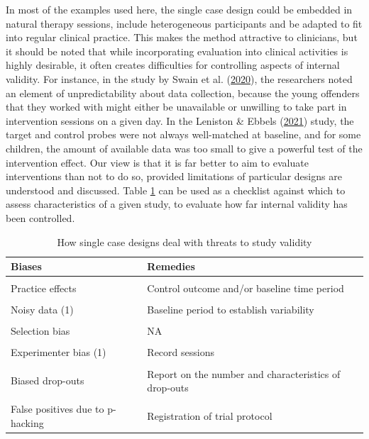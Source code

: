 \documentclass{krantz}
\begin{document}
In most of the examples used here, the single case design could be embedded in natural therapy sessions, include heterogeneous participants and be adapted to fit into regular clinical practice. This makes the method attractive to clinicians, but it should be noted that while incorporating evaluation into clinical activities is highly desirable, it often creates difficulties for controlling aspects of internal validity. For instance, in the study by Swain et al. (\protect\hyperlink{ref-swain2020}{2020}), the researchers noted an element of unpredictability about data collection, because the young offenders that they worked with might either be unavailable or unwilling to take part in intervention sessions on a given day. In the Leniston \& Ebbels (\protect\hyperlink{ref-leniston2021}{2021}) study, the target and control probes were not always well-matched at baseline, and for some children, the amount of available data was too small to give a powerful test of the intervention effect. Our view is that it is far better to aim to evaluate interventions than not to do so, provided limitations of particular designs are understood and discussed. Table \ref{tab:singlecasechart} can be used as a checklist against which to assess characteristics of a given study, to evaluate how far internal validity has been controlled.

\begin{table}

\caption{\label{tab:singlecasechart}How single case designs deal with threats to study validity}
\centering
\begin{tabular}[t]{>{\centering\arraybackslash}p{9em}>{\centering\arraybackslash}p{15em}}
\toprule
Biases & Remedies\\
\midrule
\cellcolor{gray!6}{Spontaneous improvement} & \cellcolor{gray!6}{Control outcome and/or baseline time period}\\
Practice effects & Control outcome and/or baseline time period\\
\cellcolor{gray!6}{Regression to the mean} & \cellcolor{gray!6}{Control outcome and/or baseline time period}\\
Noisy data (1) & Baseline period to establish variability\\
\cellcolor{gray!6}{Noisy data (2)} & \cellcolor{gray!6}{Outcomes with low measurement error}\\
\addlinespace
Selection bias & NA\\
\cellcolor{gray!6}{Placebo effects} & \cellcolor{gray!6}{-}\\
Experimenter bias (1) & Record sessions\\
\cellcolor{gray!6}{Experimenter bias (2)} & \cellcolor{gray!6}{Strictly specified protocol}\\
Biased drop-outs & Report on the number and characteristics of drop-outs\\
\addlinespace
\cellcolor{gray!6}{Low power} & \cellcolor{gray!6}{A priori power analysis; need for many observations}\\
False positives due to p-hacking & Registration of trial protocol\\
\bottomrule
\end{tabular}
\end{table}
\end{document}
